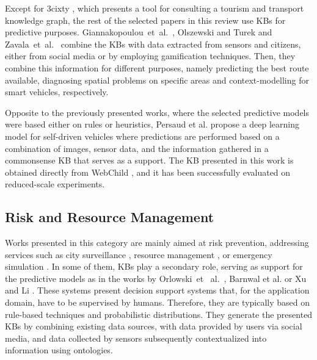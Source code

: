 
Except for 3cixty \citep{3cixty}, which presents a tool for consulting a tourism and transport knowledge graph, the rest of the selected papers in this review use KBs for predictive purposes. Giannakopoulou~et~al.~\citep{giannakopouliuetal}, Olszewski and Turek \citep{olszewskiturek} and Zavala~et~al.~\citep{zavalaetal} combine the KBs with data extracted from sensors and citizens, either from social media or by employing gamification techniques. Then, they combine this information for different purposes, namely predicting the best route available, diagnosing spatial problems on specific areas and context-modelling for smart vehicles, respectively. 

Opposite to the previously presented works, where the selected predictive models were based either on rules or heuristics, Persaud et al. \citep{persaudetal} propose a deep learning model for self-driven vehicles where predictions are performed based on a combination of images, sensor data, and the information gathered in a commonsense KB that serves as a support. The KB presented in this work is obtained directly from WebChild \citep{webchild}, and it has been successfully evaluated on reduced-scale experiments. 


\subsection{Risk and Resource Management}
Works presented in this category are mainly aimed at risk prevention, addressing services such as city surveillance \citep{orlowskietal}, resource management \citep{barnwaletal}, or emergency simulation \citep{xuandli}. In some of them, KBs play a secondary role, serving as support for the predictive models as in the works by Orlowski~et~ al.~\citep{orlowskietal}, Barnwal et al. \citep{barnwaletal} or Xu and Li \citep{xuandli}. These systems present decision support systems that, for the application domain, have to be supervised by humans. Therefore, they are typically based on rule-based techniques and probabilistic distributions. They generate the presented KBs by combining existing data sources, with data provided by users via social media, and data collected by sensors subsequently contextualized into information using ontologies. 

